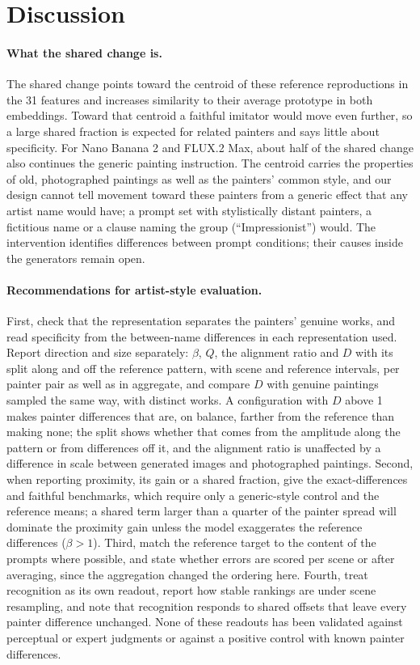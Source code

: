 \documentclass[10pt]{article}
\begin{document}
\section{Discussion}\label{sec:discussion}

\paragraph{What the shared change is.}
The shared change points toward the centroid of these reference reproductions in the 31 features
and increases similarity to their average prototype in both embeddings. Toward that centroid a
faithful imitator would move even further, so a large shared fraction is expected for related
painters and says little about specificity. For Nano Banana 2 and FLUX.2 Max, about half of the
shared change also continues the generic painting instruction. The centroid carries the properties
of old, photographed paintings as well as the painters' common style, and our design cannot tell
movement toward these painters from a generic effect that any artist name would have; a prompt set
with stylistically distant painters, a fictitious name or a clause naming the group
(``Impressionist'') would. The intervention identifies differences between prompt conditions; their
causes inside the generators remain open.

\paragraph{Recommendations for artist-style evaluation.}
First, check that the representation separates the painters' genuine works, and read specificity
from the between-name differences in each representation used. Report direction and size
separately: $\beta$, $Q$, the alignment ratio and $D$ with its split along and off the reference
pattern, with scene and reference intervals, per painter pair as well as in aggregate, and compare
$D$ with genuine paintings sampled the same way, with distinct works. A configuration with $D$ above
1 makes painter differences that are, on balance, farther from the reference than making none; the
split shows whether that comes from the amplitude along the pattern or from differences off it, and
the alignment ratio is unaffected by a difference in scale between generated images and
photographed paintings. Second, when reporting proximity, its gain or a shared fraction, give the
exact-differences and faithful benchmarks, which require only a generic-style control and the
reference means; a shared term larger than a quarter of the painter spread will dominate the
proximity gain unless the model exaggerates the reference differences ($\beta>1$). Third, match the
reference target to the content of the prompts where possible, and state whether errors are scored
per scene or after averaging, since the aggregation changed the ordering here. Fourth, treat
recognition as its own readout, report how stable rankings are under scene resampling, and note
that recognition responds to shared offsets that leave every painter difference unchanged. None of
these readouts has been validated against perceptual or expert judgments or against a positive
control with known painter differences.
\end{document}
